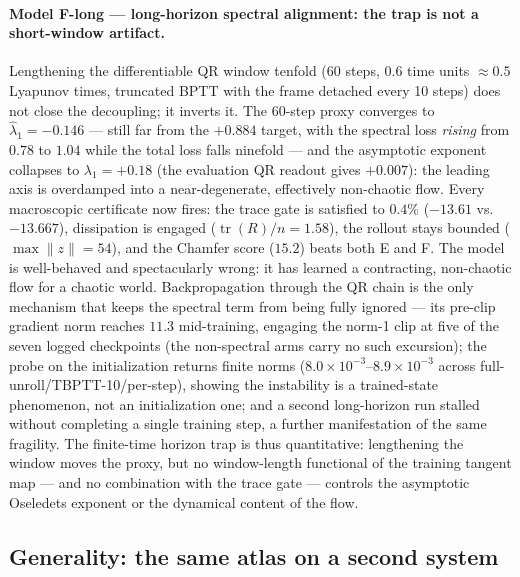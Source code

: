 \documentclass[journal]{IEEEtran}
\newcommand{\tr}{\operatorname{tr}}
\begin{document}
\paragraph{Model F-long --- long-horizon spectral alignment: the trap
is not a short-window artifact.}
Lengthening the differentiable QR window tenfold (60 steps,
$0.6$ time units $\approx0.5$ Lyapunov times, truncated BPTT with the
frame detached every 10 steps) does not close the decoupling; it
inverts it. The 60-step proxy converges to $\hat\lambda_1=-0.146$
--- still far from the $+0.884$ target, with the spectral loss
\emph{rising} from $0.78$ to $1.04$ while the total loss falls
ninefold --- and the asymptotic exponent collapses to
$\lambda_1=+0.18$ (the evaluation QR readout gives $+0.007$): the
leading axis is overdamped into a near-degenerate, effectively
non-chaotic flow. Every macroscopic certificate now fires: the trace
gate is satisfied to $0.4\%$ ($-13.61$ vs.\ $-13.667$), dissipation
is engaged ($\tr(R)/n=1.58$), the rollout stays bounded
($\max\|z\|=54$), and the Chamfer score ($15.2$) beats both E and
F. The model is well-behaved and spectacularly wrong: it has learned
a contracting, non-chaotic flow for a chaotic world. Backpropagation
through the QR chain is the only mechanism that keeps the spectral
term from being fully ignored --- its pre-clip gradient norm reaches
$11.3$ mid-training, engaging the norm-1 clip at five of the seven
logged checkpoints (the non-spectral arms carry no such excursion);
the probe on the initialization returns
finite norms ($8.0{\times}10^{-3}$--$8.9{\times}10^{-3}$ across
full-unroll/TBPTT-10/per-step), showing the instability is a
trained-state phenomenon, not an initialization one; and a second
long-horizon run stalled without completing a single training step,
a further manifestation of the same fragility. The finite-time
horizon trap is thus quantitative: lengthening the window moves the
proxy, but no window-length functional of the training tangent map
--- and no combination with the trace gate --- controls the
asymptotic Oseledets exponent or the dynamical content of the flow.

\subsection{Generality: the same atlas on a second system}
\label{sec:lz4}
\end{document}
